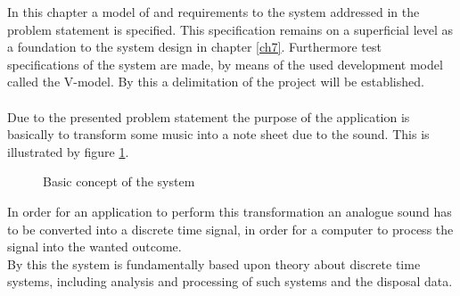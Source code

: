 In this chapter a model of and requirements to the system addressed in the problem statement is specified. This specification remains on a superficial level as a foundation to the system design in chapter \ref{ch7}. Furthermore test specifications of the system are made, by means of the used development model called the V-model. By this a delimitation of the project will be established. \\   
\\
Due to the presented problem statement the purpose of the application is basically to transform some music into a note sheet due to the sound. This is illustrated by figure \ref{fig:model1}.    
\begin{figure}[h]
\centering
{}
\caption{Basic concept of the system}
\label{fig:model1}
\end{figure}
In order for an application to perform this transformation an analogue sound has to be converted into a discrete time signal, in order for a computer to process the signal into the wanted outcome. \\
By this the system is fundamentally based upon theory about discrete time systems, including analysis and processing of such systems and the disposal data.

